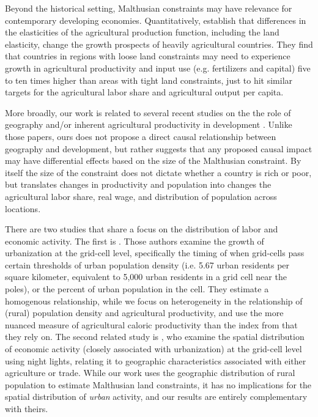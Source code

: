 \documentclass[11pt]{article}
\begin{document}
Beyond the historical setting, Malthusian constraints may have relevance for contemporary developing economies. Quantitatively, \citet{ev2016clim,ev2016} establish that differences in the elasticities of the agricultural production function, including the land elasticity, change the growth prospects of heavily agricultural countries. They find that countries in regions with loose land constraints may need to experience growth in agricultural productivity and input use (e.g. fertilizers and capital) five to ten times higher than areas with tight land constraints, just to hit similar targets for the agricultural labor share and agricultural output per capita.

More broadly, our work is related to several recent studies on the the role of geography and/or inherent agricultural productivity in development \citep{oh2005,ashraf2010dynamics,Nunn2011,Nunn2012,mich2012,agn2013,cook2014role,cook14,fenske2014,alsan2015,ashrafmich2015,dks2015,galorozak2016,litina2016,ads2016,FrankemaPap2017}. Unlike those papers, ours does not propose a direct causal relationship between geography and development, but rather suggests that any proposed causal impact may have differential effects based on the size of the Malthusian constraint. By itself the size of the constraint does not dictate whether a country is rich or poor, but translates changes in productivity and population into changes the agricultural labor share, real wage, and distribution of population across locations.

There are two studies that share a focus on the distribution of labor and economic activity. The first is \citet{mfm2014}. Those authors examine the growth of urbanization at the grid-cell level, specifically the timing of when grid-cells pass certain thresholds of urban population density (i.e. 5.67 urban residents per square kilometer, equivalent to 5,000 urban residents in a grid cell near the poles), or the percent of urban population in the cell. They estimate a homogenous relationship, while we focus on heterogeneity in the relationship of (rural) population density and agricultural productivity, and use the more nuanced measure of agricultural caloric productivity than the index from \citet{ramankutty2002} that they rely on. The second related study is \citet{hssw2016}, who examine the spatial distribution of economic activity (closely associated with urbanization) at the grid-cell level using night lights, relating it to geographic characteristics associated with either agriculture or trade. While our work uses the geographic distribution of rural population to estimate Malthusian land constraints, it has no implications for the spatial distribution of \textit{urban} activity, and our results are entirely complementary with theirs.
\end{document}
